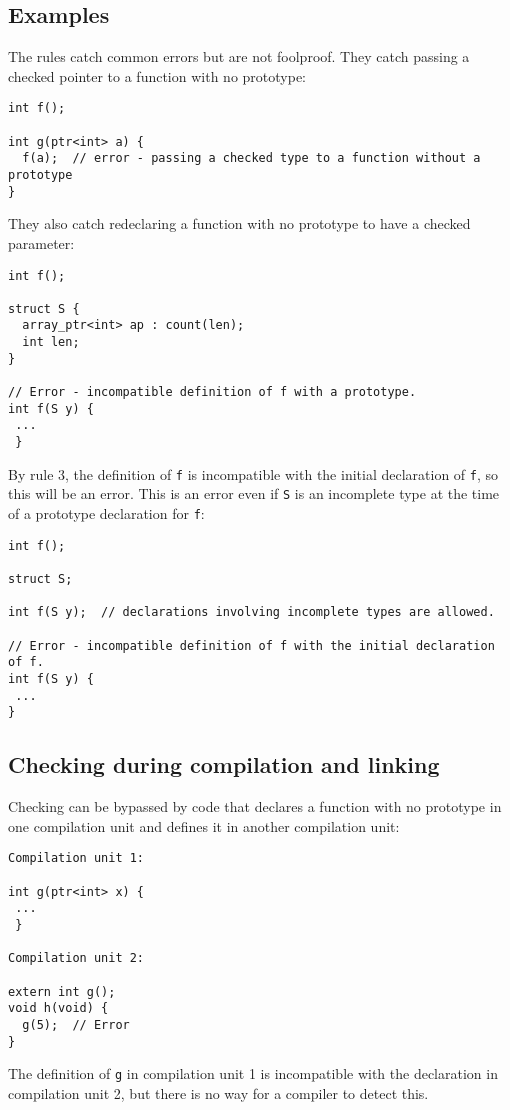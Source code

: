 \subsection{Examples}
The rules catch common errors but are not foolproof.  They catch passing a checked pointer
to a function with no prototype:
\begin{verbatim}
int f();

int g(ptr<int> a) {
  f(a);  // error - passing a checked type to a function without a prototype
}
\end{verbatim}
They also catch redeclaring a function with no prototype to have a checked parameter:
\begin{verbatim}
int f();

struct S {
  array_ptr<int> ap : count(len);
  int len;
}

// Error - incompatible definition of f with a prototype.
int f(S y) {
 ...
 }
\end{verbatim}
By rule 3, the definition of \verb+f+ is incompatible with the initial 
declaration of \verb+f+, so this will be an error.  This is an error even 
if \verb+S+ is an incomplete type at the time of
a prototype declaration for \verb+f+:
\begin{verbatim} 
int f();

struct S;

int f(S y);  // declarations involving incomplete types are allowed.

// Error - incompatible definition of f with the initial declaration of f.
int f(S y) {
 ...
}
\end{verbatim}

\subsection{Checking during compilation and linking}
Checking can be bypassed by code that declares a function with no prototype in one 
compilation unit and defines it in another compilation unit:
\begin{verbatim}
Compilation unit 1:

int g(ptr<int> x) {
 ...
 }

Compilation unit 2:

extern int g();
void h(void) {
  g(5);  // Error
}
\end{verbatim}
The definition of \verb+g+ in compilation unit 1 is incompatible with
the declaration in compilation unit 2, but there is no way for a compiler
to detect this.

